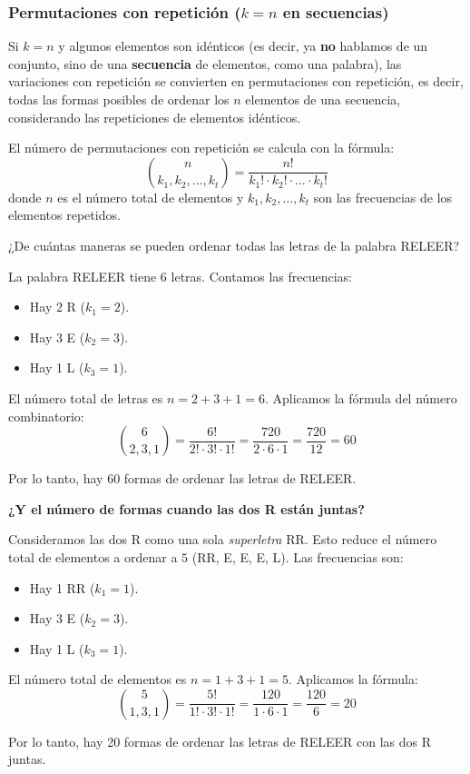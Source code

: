 \documentclass[a4paper,12pt]{article}
\begin{document}
\subsubsection{Permutaciones con repetición ($k=n$ en secuencias)}

\begin{procedimiento}[title=Permutaciones con repetición]
Si $k = n$ y algunos elementos son idénticos (es decir, ya \textbf{no} hablamos de un conjunto, sino de una \textbf{secuencia }de elementos, como una palabra), las variaciones con repetición se convierten en permutaciones con repetición, es decir, todas las formas posibles de ordenar los $n$ elementos de una secuencia, considerando las repeticiones de elementos idénticos.

El número de permutaciones con repetición se calcula con la fórmula:
\[
\binom{n}{k_1, k_2, \dots, k_t} = \frac{n!}{k_1! \cdot k_2! \cdot \dots \cdot k_t!}
\]
donde $n$ es el número total de elementos y $k_1, k_2, \dots, k_t$ son las frecuencias de los elementos repetidos.
\end{procedimiento}

\begin{ejemplo}[title=Ejemplo: Ordenar las letras de RELEER]
¿De cuántas maneras se pueden ordenar todas las letras de la palabra RELEER?

La palabra RELEER tiene 6 letras. Contamos las frecuencias:
\begin{itemize}
    \item Hay 2 R ($k_1 = 2$).
    \item Hay 3 E ($k_2 = 3$).
    \item Hay 1 L ($k_3 = 1$).
\end{itemize}

El número total de letras es $n = 2 + 3 + 1 = 6$. Aplicamos la fórmula del número combinatorio:
\[
\binom{6}{2, 3, 1} = \frac{6!}{2! \cdot 3! \cdot 1!} = \frac{720}{2 \cdot 6 \cdot 1} = \frac{720}{12} = 60
\]

Por lo tanto, hay 60 formas de ordenar las letras de RELEER.

\textbf{¿Y el número de formas cuando las dos R están juntas?}

Consideramos las dos R como una sola \textit{superletra} RR. Esto reduce el número total de elementos a ordenar a $5$ (RR, E, E, E, L). Las frecuencias son:
\begin{itemize}
    \item Hay 1 RR ($k_1 = 1$).
    \item Hay 3 E ($k_2 = 3$).
    \item Hay 1 L ($k_3 = 1$).
\end{itemize}

El número total de elementos es $n = 1 + 3 + 1 = 5$. Aplicamos la fórmula:
\[
\binom{5}{1, 3, 1} = \frac{5!}{1! \cdot 3! \cdot 1!} = \frac{120}{1 \cdot 6 \cdot 1} = \frac{120}{6} = 20
\]

Por lo tanto, hay 20 formas de ordenar las letras de RELEER con las dos R juntas.
\end{ejemplo}
\end{document}
